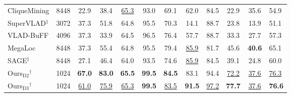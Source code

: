 \begin{table}[!htb]
{\begin{tabular}{ll ccccccccc|M}
CliqueMining & 8448 & 22.9 & 38.4 & \underline{65.3} & 93.0 & 69.1 & 62.0 & 84.5 & 22.9 & 35.6 & 54.9 \\
SuperVLAD$^\ddag$ & 3072 & 37.3 & 51.8 & 64.8 & 95.5 & 70.3 & 14.1 & 88.7 & 23.8 & 13.9 & 51.1 \\
VLAD-BuFF & 4096 & 37.3 & 33.9 & 64.5 & 96.5 & 76.4 & 57.7 & 88.7 & 33.3 & 27.7 & 57.3 \\
MegaLoc & 8448 & 37.3 & 55.4 & 64.8 & 95.5 & 79.4 & \underline{85.9} & 81.7 & 45.6 & \textbf{40.6} & 65.1 \\
SAGE$^\ddag$ & 8448 & 27.1 & 46.4 & 64.0 & 93.5 & 74.6 & \underline{85.9} & 84.5 & 39.1 & 24.8 & 60.0 \\
\midrule
Ours$_{\mathrm{D2}}$$^{\dagger}$ & 1024 & \textbf{67.0} & \textbf{83.0} & \textbf{65.5} & \textbf{99.5} & \textbf{84.5} & 83.1 & 94.4 & \underline{72.2} & \underline{37.6} & \underline{76.3} \\
Ours$_{\mathrm{D3}}$$^{\dagger}$ & 1024 & \underline{61.0} & \underline{75.9} & \underline{65.3} & \textbf{99.5} & \underline{83.5} & \textbf{91.5} & \underline{97.2} & \textbf{77.7} & \underline{37.6} & \textbf{76.6} \\
\bottomrule
\end{tabular}%
}
\end{table}

\FloatBarrier

